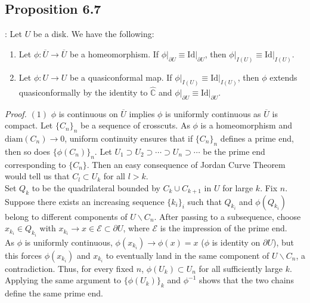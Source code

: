 \documentclass[11pt,a4paper]{article}
\begin{document}
    \subsection*{Proposition 6.7}: Let $U$ be a disk. We have the following:
    \begin{enumerate}
        \item Let $\phi:\overline{U}\rightarrow\overline{U}$ be a homeomorphism. If $\phi\big|_{\partial U} \equiv \text{Id}\big|_{\partial U}$, then $\phi\big|_{I(U)} \equiv \text{Id}\big|_{I(U)}$.
        \item Let $\phi:U\rightarrow U$ be a quasiconformal map. If $\phi\big|_{I(U)} \equiv \text{Id}\big|_{I(U)}$, then $\phi$ extends quasiconformally by the identity to $\hat{\mathbb{C}}$ and $\phi\big|_{\partial U} \equiv \text{Id}\big|_{\partial U}$.
    \end{enumerate}


    \textit{Proof.} $(1)$ $\phi$ is continuous on $\overline{U}$ implies $\phi$ is uniformly continuous as $\overline{U}$ is compact. Let $\{C_n\}_n$ be a sequence of crosscuts. As $\phi$ is a homeomorphism and $\text{diam}(C_n) \rightarrow 0$, uniform continuity ensures that if $\{C_n\}_n$ defines a prime end, then so does $\{\phi(C_n)\}_n$. Let $U_1 \supset U_2 \supset \cdots \supset U_n \supset \cdots$ be the prime end corresponding to $\{C_n\}$. Then an easy consequence of Jordan Curve Theorem would tell us that $C_l \subset U_k$ for all $l>k$.\\
    Set $Q_k$ to be the quadrilateral bounded by $C_k\cup C_{k+1}$ in $U$ for large $k$. Fix $n$. Suppose there exists an increasing sequence $\{k_i\}_i$ such that $Q_{k_i}$ and $\phi(Q_{k_i})$ belong to different components of $U\backslash C_n$. After passing to a subsequence, choose $x_{k_i}\in Q_{k_i}$ with $x_{k_i}\rightarrow x\in\mathcal E\subset\partial U$, where $\mathcal E$ is the impression of the prime end.\\
    As $\phi$ is uniformly continuous, $\phi(x_{k_i})\rightarrow\phi(x)=x$ ($\phi$ is identity on $\partial U$), but this forces $\phi(x_{k_i})$ and $x_{k_i}$ to eventually land in the same component of $U\backslash C_n$, a contradiction. Thus, for every fixed $n$, $\phi(U_k)\subset U_n$ for all sufficiently large $k$. Applying the same argument to $\{\phi(U_k)\}_k$ and $\phi^{-1}$ shows that the two chains define the same prime end.
\end{document}
